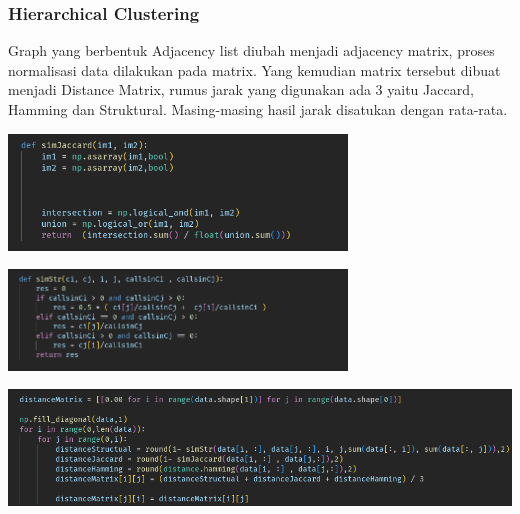 \subsubsection{Hierarchical Clustering}
Graph yang berbentuk Adjacency list diubah menjadi adjacency matrix, proses normalisasi data dilakukan pada matrix. Yang kemudian matrix tersebut dibuat menjadi Distance Matrix, rumus jarak yang digunakan ada 3 yaitu Jaccard, Hamming dan Struktural. Masing-masing hasil jarak disatukan dengan rata-rata. 
\begin{center}
	\includegraphics[width=9cm]{img/bab_3/simJaccard.png}
	\label{fig:asd}
\end{center}
\begin{center}
	\includegraphics[width=9cm]{img/bab_3/simStr.png}
	\label{fig:asd}
\end{center}
\begin{center}
	\includegraphics[width=14cm]{img/bab_3/distanceMatrix.png}
	\label{fig:asd}
\end{center}

